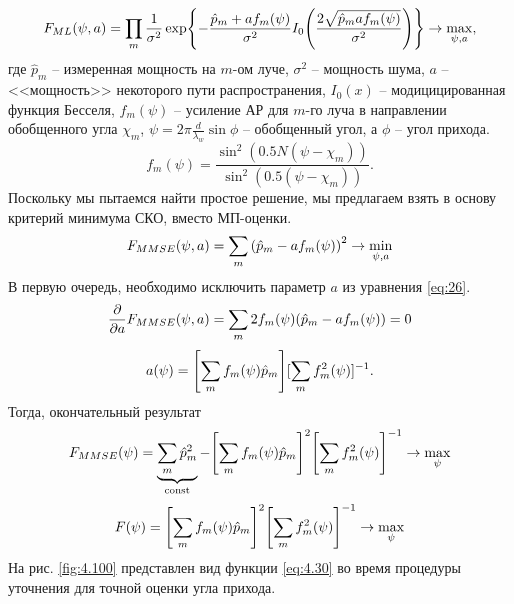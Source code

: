 \begin{equation}
    F_{ML}(\psi, a) = \prod\limits_m \frac{1}{\sigma^2}
    \exp{-\frac{\hat p_m + a f_m(\psi)}{\sigma^2}
        I_0\qty(\frac{2\sqrt{\hat p_m a f_m(\psi)}}{\sigma^2})} \to \max_{\psi, a},
\end{equation}
где $\hat p_m$ -- измеренная мощность на $m$-ом луче, $\sigma^2$ -- мощность
шума, $a$ -- <<мощность>> некоторого пути распространения, $I_0(x)$ --
модицицированная функция Бесселя, $f_m(\psi)$ -- усиление АР для $m$-го луча в
направлении обобщенного угла $\chi_m$, $\psi = 2\pi \frac{d}{\lambda_w}\sin
    \phi$ -- обобщенный угол, а $\phi$ -- угол прихода.
\begin{equation}
    f_m(\psi) = \frac{\sin^2 (0.5N(\psi - \chi_m))}{\sin^2(0.5(\psi - \chi_m))}.
\end{equation}
Поскольку мы пытаемся найти простое решение, мы предлагаем взять в основу
критерий минимума СКО, вместо МП-оценки.
\begin{equation}
    \label{eq:26}
    F_{MMSE}(\psi, a) = \sum\limits_m \qty(\hat p_m - a f_m(\psi))^2 \to \min_{\psi,a}
\end{equation}
В первую очередь, необходимо исключить параметр $a$ из уравнения \eqref{eq:26}.
\begin{equation}
    \pdv{a} F_{MMSE}(\psi, a) = \sum\limits_m 2f_m(\psi) (\hat p_m - a f_m(\psi)) = 0
\end{equation}
\begin{equation}
    a(\psi) = \qty[\sum\limits_m f_m(\psi) \hat p_m][\sum\limits_m f_m^2(\psi)]^{-1}.
\end{equation}
Тогда, окончательный результат
\begin{equation}
    F_{MMSE}(\psi)=\underbrace{\sum\limits_m \hat p_m^2}_{\text{const}} - \qty[\sum\limits_m f_m(\psi) \hat p_m]^2 \qty[\sum \limits_m f_m^2 (\psi)]^{-1} \to \max_{\psi}
\end{equation}
\begin{equation}
    \label{eq:4.30}
    F(\psi)=\qty[\sum\limits_m f_m(\psi) \hat p_m]^2 \qty[\sum \limits_m f_m^2 (\psi)]^{-1} \to \max_{\psi}
\end{equation}
На рис. \ref{fig:4.100} представлен вид функции \eqref{eq:4.30} во время процедуры уточнения для точной оценки угла прихода.

